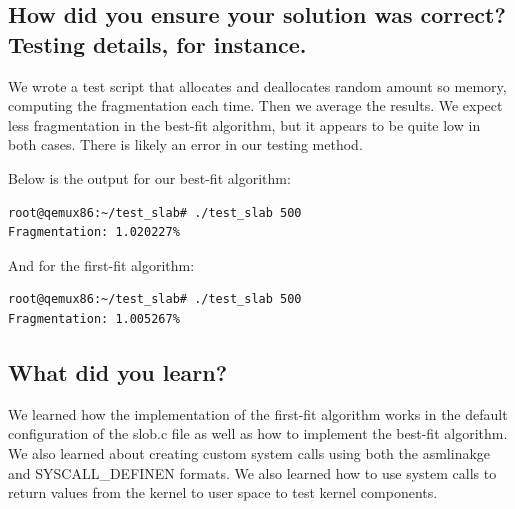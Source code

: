 \documentclass[letterpaper, onecolumn, draftclsnofoot, 10pt, compsoc]{IEEEtran}
\begin{document}
    \subsection{How did you ensure your solution was correct? Testing details, for instance.}
        \begin{singlespace}
        We wrote a test script that allocates and deallocates random amount so memory, computing the fragmentation each time. Then we average the results.
        We expect less fragmentation in the best-fit algorithm, but it appears to be quite low in both cases. There is likely an error in our testing method.
        
        Below is the output for our best-fit algorithm:
        \begin{lstlisting}[language=bash]
root@qemux86:~/test_slab# ./test_slab 500
Fragmentation: 1.020227%
        \end{lstlisting}
        And for the first-fit algorithm:
        \begin{lstlisting}[language=bash]
root@qemux86:~/test_slab# ./test_slab 500
Fragmentation: 1.005267%
        \end{lstlisting}
        \end{singlespace}
    
    \subsection{What did you learn?}
        \begin{singlespace}
        We learned how the implementation of the first-fit algorithm works in the default configuration of the slob.c file as well as how to implement the best-fit algorithm. We also learned about creating custom system calls using both the asmlinakge and SYSCALL\_DEFINEN formats. We also learned how to use system calls to return values from the kernel to user space to test kernel components.
        \end{singlespace}
        
\end{document}
